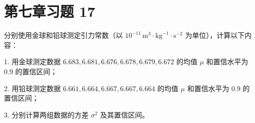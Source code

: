 \documentclass[twoside]{article}
\begin{document}
\maketitle
\vspace{-3.5em}

\tableofcontents

\section{第七章习题 17}


分别使用金球和铅球测定引力常数（以 $10^{-11} \, \text{m}^3 \cdot \text{kg}^{-1} \cdot \text{s}^{-2}$ 为单位），计算以下内容：
    
1. 用金球测定数据 $6.683, 6.681, 6.676, 6.678, 6.679, 6.672$ 的均值 $\mu$ 和置信水平为 $0.9$ 的置信区间；

2. 用铅球测定数据 $6.661, 6.664, 6.667, 6.667, 6.664$ 的均值 $\mu$ 和置信水平为 $0.9$ 的置信区间；

3. 分别计算两组数据的方差 $\sigma^2$ 及其置信区间。
\end{document}
